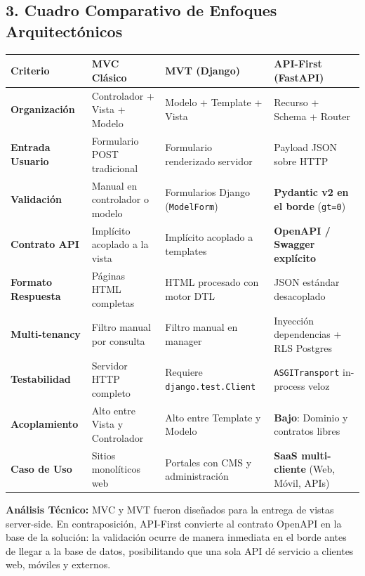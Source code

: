 \documentclass[11pt,a4paper]{article}
\begin{document}
\vspace{0.3cm}

\subsection*{3. Cuadro Comparativo de Enfoques Arquitectónicos}

\noindent
\begin{tabularx}{\textwidth}{p{3.2cm} X X X}
\toprule
\textbf{Criterio} & \textbf{MVC Clásico} & \textbf{MVT (Django)} & \textbf{API-First (FastAPI)} \\
\midrule
\textbf{Organización} & Controlador + Vista + Modelo & Modelo + Template + Vista & Recurso + Schema + Router \\
\addlinespace
\textbf{Entrada Usuario} & Formulario POST tradicional & Formulario renderizado servidor & Payload JSON sobre HTTP \\
\addlinespace
\textbf{Validación} & Manual en controlador o modelo & Formularios Django (\texttt{ModelForm}) & \textbf{Pydantic v2 en el borde} (\texttt{gt=0}) \\
\addlinespace
\textbf{Contrato API} & Implícito acoplado a la vista & Implícito acoplado a templates & \textbf{OpenAPI / Swagger explícito} \\
\addlinespace
\textbf{Formato Respuesta} & Páginas HTML completas & HTML procesado con motor DTL & JSON estándar desacoplado \\
\addlinespace
\textbf{Multi-tenancy} & Filtro manual por consulta & Filtro manual en manager & Inyección dependencias + RLS Postgres \\
\addlinespace
\textbf{Testabilidad} & Servidor HTTP completo & Requiere \texttt{django.test.Client} & \texttt{ASGITransport} in-process veloz \\
\addlinespace
\textbf{Acoplamiento} & Alto entre Vista y Controlador & Alto entre Template y Modelo & \textbf{Bajo}: Dominio y contratos libres \\
\addlinespace
\textbf{Caso de Uso} & Sitios monolíticos web & Portales con CMS y administración & \textbf{SaaS multi-cliente} (Web, Móvil, APIs) \\
\bottomrule
\end{tabularx}

\vspace{0.3cm}
\noindent\textbf{Análisis Técnico:} MVC y MVT fueron diseñados para la entrega de vistas server-side. En contraposición, API-First convierte al contrato OpenAPI en la base de la solución: la validación ocurre de manera inmediata en el borde antes de llegar a la base de datos, posibilitando que una sola API dé servicio a clientes web, móviles y externos.
\end{document}
